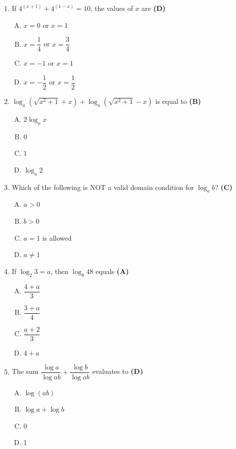 \documentclass[10pt,a4paper]{article}
\begin{document}
\begin{enumerate}[1.]
\item If $4^{(x+1)} + 4^{(1-x)} = 10$, the values of $x$ are \hfill \textbf{(D)}
\begin{enumerate}[(A)]
    \item $x = 0$ or $x = 1$
    \item $x = \dfrac{1}{4}$ or $x = \dfrac{3}{4}$
    \item $x = -1$ or $x = 1$
    \item $x = -\dfrac{1}{2}$ or $x = \dfrac{1}{2}$
\end{enumerate}

\item $\log_a\!\left(\sqrt{x^2+1}+x\right) + \log_a\!\left(\sqrt{x^2+1}-x\right)$ is equal to \hfill \textbf{(B)}
\begin{enumerate}[(A)]
    \item $2\log_a x$
    \item $0$
    \item $1$
    \item $\log_a 2$
\end{enumerate}

\item Which of the following is NOT a valid domain condition for $\log_a b$? \hfill \textbf{(C)}
\begin{enumerate}[(A)]
    \item $a > 0$
    \item $b > 0$
    \item $a = 1$ is allowed
    \item $a \neq 1$
\end{enumerate}

\item If $\log_2 3 = a$, then $\log_8 48$ equals \hfill \textbf{(A)}
\begin{enumerate}[(A)]
    \item $\dfrac{4+a}{3}$
    \item $\dfrac{3+a}{4}$
    \item $\dfrac{a+2}{3}$
    \item $4+a$
\end{enumerate}

\item The sum $\dfrac{\log a}{\log ab} + \dfrac{\log b}{\log ab}$ evaluates to \hfill \textbf{(D)}
\begin{enumerate}[(A)]
    \item $\log(ab)$
    \item $\log a + \log b$
    \item 0
    \item 1
\end{enumerate}


\end{enumerate}
\end{document}
